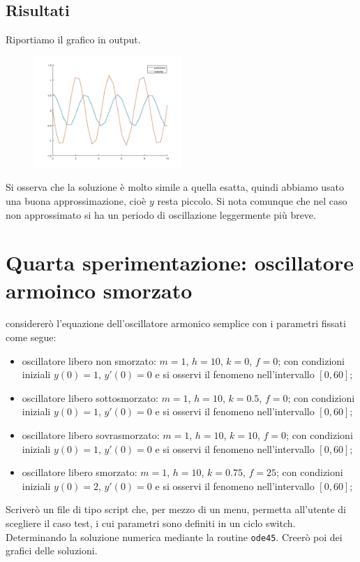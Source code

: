 \documentclass{article}
\begin{document}
	\subsection{Risultati}
	Riportiamo il grafico in output.\\
	\begin{figure}[htp!]
		\centering 
		\includegraphics[width=0.5\textwidth]{5_3.jpeg}
	\end{figure}
	Si osserva che la soluzione è molto simile a quella esatta, quindi abbiamo usato una buona approssimazione, cioè $y$ resta piccolo. Si nota comunque che nel caso non approssimato si ha un periodo di oscillazione leggermente più breve.
	
	\section{Quarta sperimentazione: oscillatore armoinco smorzato}
	 considererò l'equazione dell'oscillatore armonico semplice con i parametri fissati come segue:
	 \begin{itemize}
	 	\item oscillatore libero non smorzato: $m=1$, $h=10$, $k=0$, $f = 0$; con condizioni iniziali $y(0) = 1$, $y'(0)=0$ e si osservi il fenomeno nell'intervallo $\left[0, 60\right]$;
	 	\item oscillatore libero sottosmorzato: $m=1$, $h=10$, $k=0.5$, $f = 0$; con condizioni iniziali $y(0) = 1$, $y'(0)=0$ e si osservi il fenomeno nell'intervallo $\left[0, 60\right]$;
	 	\item oscillatore libero sovrasmorzato: $m=1$, $h=10$, $k=10$, $f = 0$; con condizioni iniziali $y(0) = 1$, $y'(0)=0$ e si osservi il fenomeno nell'intervallo $\left[0, 60\right]$;
	 	\item oscillatore libero smorzato: $m=1$, $h=10$, $k=0.75$, $f = 25$; con condizioni iniziali $y(0) = 2$, $y'(0)=0$ e si osservi il fenomeno nell'intervallo $\left[0, 60\right]$;
	 \end{itemize}
	Scriverò un file di tipo script che, per mezzo di un menu, permetta all’utente di scegliere il caso test, i cui parametri
	sono definiti in un ciclo switch. Determinando la soluzione numerica mediante la routine {\tt ode45}. Creerò poi dei grafici delle soluzioni.
\end{document}
